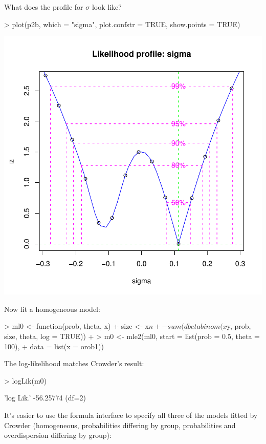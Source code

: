 \documentclass{article}
\begin{document}
What does the profile for $\sigma$ look like?
\begin{Schunk}
\begin{Sinput}
> plot(p2b, which = "sigma", plot.confstr = TRUE, show.points = TRUE)
\end{Sinput}
\end{Schunk}
\includegraphics{mle2-026}

Now fit a homogeneous model:
\begin{Schunk}
\begin{Sinput}
> ml0 <- function(prob, theta, x) {
+     size <- x$n
+     -sum(dbetabinom(x$y, prob, size, theta, log = TRUE))
+ }
> m0 <- mle2(ml0, start = list(prob = 0.5, theta = 100), 
+     data = list(x = orob1))
\end{Sinput}
\end{Schunk}

The log-likelihood matches Crowder's result:
\begin{Schunk}
\begin{Sinput}
> logLik(m0)
\end{Sinput}
\begin{Soutput}
'log Lik.' -56.25774 (df=2)
\end{Soutput}
\end{Schunk}

It's easier to 
use the formula interface
to specify all three of the models
fitted by Crowder (homogeneous, probabilities differing
by group, probabilities and overdispersion differing
by group):
\end{document}
